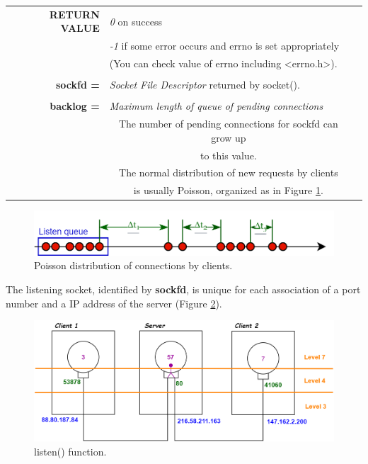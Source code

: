 \begin{table}[h]
\centering
\begin{tabular}{rcl}
\textbf{RETURN VALUE} & \multicolumn{2}{l}{\textit{0} on success}\\
{} & \multicolumn{2}{l}{\textit{-1} if some error occurs and errno is set appropriately}\\
{} & \multicolumn{2}{l}{(You can check value of errno including <errno.h>).}\\
& & \\
\textbf{sockfd =} & \multicolumn{2}{l}{\textit{Socket File Descriptor} returned by socket().}\\
& &\\
\textbf{backlog =} & \multicolumn{2}{l}{\textit{Maximum length of queue of pending connections}}\\
& {The number of pending connections for sockfd can grow up}\\
& {to this value.}\\
& {The normal distribution of new requests by clients}\\
& {is usually Poisson, organized as in Figure \ref{poisson}.}
\end{tabular}
\end{table}

\begin{figure}[h]
\centering
\includegraphics[scale=0.3]{Images/NetworkC/poisson}\caption{\footnotesize{Poisson distribution of connections by clients.}}\label{poisson}
\end{figure}

The listening socket, identified by \textbf{sockfd}, is unique for each association of a port number and a IP address of the server (Figure \ref{listen}).

\begin{figure}[h]
\centering
\includegraphics[scale=0.3]{Images/NetworkC/listen}\caption{\footnotesize{listen() function.}}\label{listen}
\end{figure}

